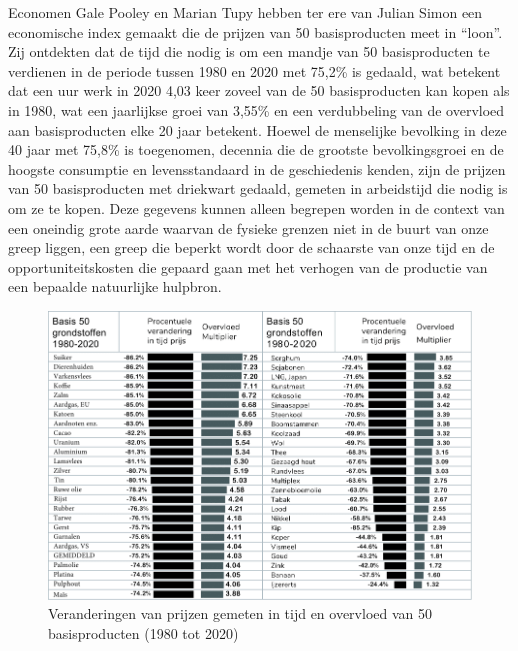 Economen Gale Pooley en Marian Tupy hebben ter ere van Julian Simon een
economische index gemaakt die de prijzen van 50 basisproducten meet in
``loon''. Zij ontdekten dat de tijd die nodig is om een mandje van 50
basisproducten te verdienen in de periode tussen 1980 en 2020 met 75,2\%
is gedaald, wat betekent dat een uur werk in 2020 4,03 keer zoveel van
de 50 basisproducten kan kopen als in 1980, wat een jaarlijkse groei van
3,55\% en een verdubbeling van de overvloed aan basisproducten elke 20
jaar betekent.\autocite{33} Hoewel de menselijke bevolking in deze
40 jaar met 75,8\% is toegenomen, decennia die de grootste
bevolkingsgroei en de hoogste consumptie en levensstandaard in de
geschiedenis kenden, zijn de prijzen van 50 basisproducten met driekwart
gedaald, gemeten in arbeidstijd die nodig is om ze te kopen. Deze
gegevens kunnen alleen begrepen worden in de context van een oneindig
grote aarde waarvan de fysieke grenzen niet in de buurt van onze greep
liggen, een greep die beperkt wordt door de schaarste van onze tijd en
de opportuniteitskosten die gepaard gaan met het verhogen van de
productie van een bepaalde natuurlijke hulpbron.

\begin{figure}[!htb]
\centering
    \includegraphics[width=\textwidth]{figures/fig4-1.png}
\caption[Veranderingen van prijzen gemeten in tijd en
overvloed van 50 basisproducten (1980 tot 2020)]{Veranderingen van prijzen gemeten in tijd en overvloed van 50 basisproducten (1980 tot 2020)}
\label{fig4}
\end{figure}


